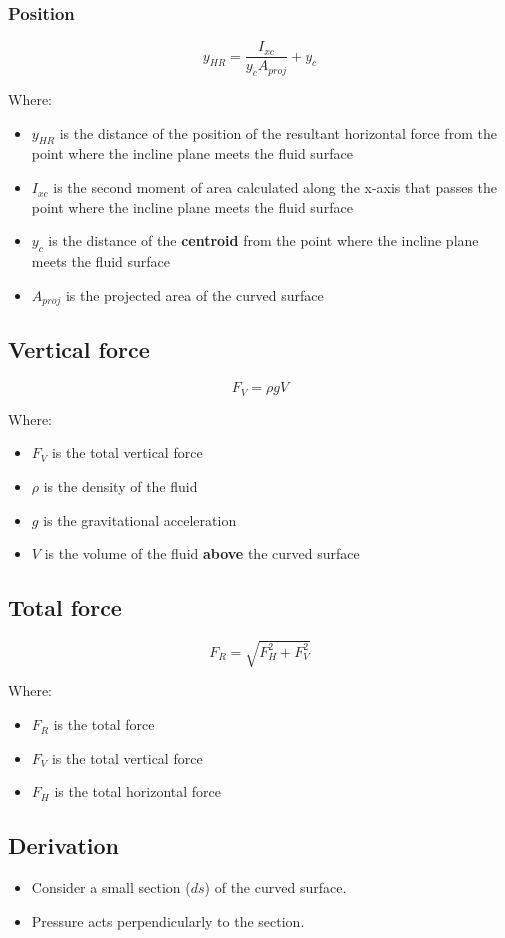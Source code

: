 \documentclass[11pt]{article}
\begin{document}
\subsubsection{Position}
\label{sec:orgc438bcf}
\[y_{HR} = \frac{I_{xc}}{y_c A_{proj}} + y_c\]

Where:
\begin{itemize}
\item \(y_{HR}\) is the distance of the position of the resultant horizontal force from the point where the incline plane meets the fluid surface
\item \(I_{xc}\) is the second moment of area calculated along the x-axis that passes the point where the incline plane meets the fluid surface
\item \(y_c\) is the distance of the \textbf{centroid} from the point where the incline plane meets the fluid surface
\item \(A_{proj}\) is the projected area of the curved surface
\end{itemize}
\subsection{Vertical force}
\label{sec:orgda061cc}
\[F_V = \rho g V\]

Where:
\begin{itemize}
\item \(F_V\) is the total vertical force
\item \(\rho\) is the density of the fluid
\item \(g\) is the gravitational acceleration
\item \(V\) is the volume of the fluid \textbf{above} the curved surface
\end{itemize}
\subsection{Total force}
\label{sec:org03396f5}
\[F_R = \sqrt{F_H^2 + F_V^2}\]

Where:
\begin{itemize}
\item \(F_R\) is the total force
\item \(F_V\) is the total vertical force
\item \(F_H\) is the total horizontal force
\end{itemize}
\subsection{Derivation}
\label{sec:org0a0600f}
\begin{itemize}
\item Consider a small section (\(ds\)) of the curved surface.
\item Pressure acts perpendicularly to the section.
\end{itemize}
\end{document}
